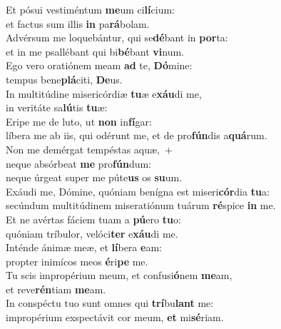 \evenverse Et pósui vestiméntum \textbf{me}um ci\textbf{lí}cium:~\*\\
\evenverse et factus sum illis \textbf{in} pa\textbf{rá}bolam.\\
\oddverse Advérsum me loquebántur, qui se\textbf{dé}bant in \textbf{por}ta:~\*\\
\oddverse et in me psallébant qui bi\textbf{bé}bant \textbf{vi}num.\\
\evenverse Ego vero oratiónem meam \textbf{ad} te, \textbf{Dó}mine:~\*\\
\evenverse tempus bene\textbf{plá}citi, \textbf{De}us.\\
\oddverse In multitúdine misericórdiæ \textbf{tu}æ e\textbf{xáu}di me,~\*\\
\oddverse in veritáte sa\textbf{lú}tis \textbf{tu}æ:\\
\evenverse Eripe me de luto, ut \textbf{non} in\textbf{fí}gar:~\*\\
\evenverse líbera me ab iis, qui odérunt me, et de pro\textbf{fún}dis a\textbf{quá}rum.\\
\oddverse Non me demérgat tempéstas aquæ,~+\\
\oddverse  neque absórbeat \textbf{me} pro\textbf{fún}dum:~\*\\
\oddverse neque úrgeat super me púte\textbf{us} os \textbf{su}um.\\
\evenverse Exáudi me, Dómine, quóniam benígna est miseri\textbf{cór}dia \textbf{tu}a:~\*\\
\evenverse secúndum multitúdinem miseratiónum tuárum \textbf{ré}spice \textbf{in} me.\\
\oddverse Et ne avértas fáciem tuam a \textbf{pú}ero \textbf{tu}o:~\*\\
\oddverse quóniam tríbulor, velóci\textbf{ter} e\textbf{xáu}di me.\\
\evenverse Inténde ánimæ meæ, et \textbf{lí}bera \textbf{e}am:~\*\\
\evenverse propter inimícos meos \textbf{é}ri\textbf{pe} me.\\
\oddverse Tu scis impropérium meum, et confusi\textbf{ó}nem \textbf{me}am,~\*\\
\oddverse et reve\textbf{rén}tiam \textbf{me}am.\\
\evenverse In conspéctu tuo sunt omnes qui \textbf{trí}bu\textbf{lant} me:~\*\\
\evenverse impropérium exspectávit cor meum, \textbf{et} mi\textbf{sé}riam.\\
